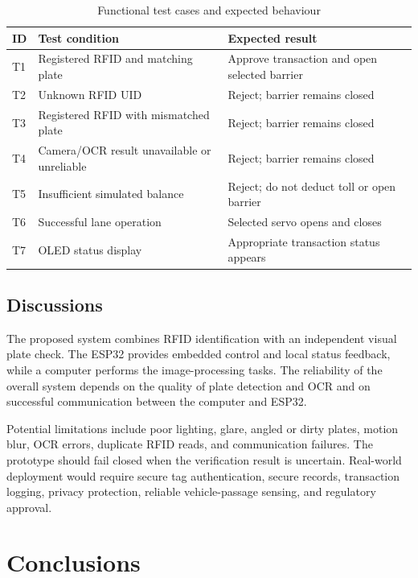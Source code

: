 \documentclass[12pt,a4paper]{report}
\begin{document}
\begin{table}[H]
\centering
\caption{Functional test cases and expected behaviour}
\begin{tabular}{p{}p{}p{}}
\toprule
\textbf{ID} & \textbf{Test condition} & \textbf{Expected result}\\
\midrule
T1 & Registered RFID and matching plate & Approve transaction and open selected barrier\\
T2 & Unknown RFID UID & Reject; barrier remains closed\\
T3 & Registered RFID with mismatched plate & Reject; barrier remains closed\\
T4 & Camera/OCR result unavailable or unreliable & Reject; barrier remains closed\\
T5 & Insufficient simulated balance & Reject; do not deduct toll or open barrier\\
T6 & Successful lane operation & Selected servo opens and closes\\
T7 & OLED status display & Appropriate transaction status appears\\
\bottomrule
\end{tabular}
\end{table}

\section{Discussions}
The proposed system combines RFID identification with an independent visual plate
check. The ESP32 provides embedded control and local status feedback, while a computer
performs the image-processing tasks. The reliability of the overall system depends on
the quality of plate detection and OCR and on successful communication between the
computer and ESP32.

Potential limitations include poor lighting, glare, angled or dirty plates, motion blur,
OCR errors, duplicate RFID reads, and communication failures. The prototype should
fail closed when the verification result is uncertain. Real-world deployment would
require secure tag authentication, secure records, transaction logging, privacy
protection, reliable vehicle-passage sensing, and regulatory approval.

\chapter{Conclusions}
\end{document}

